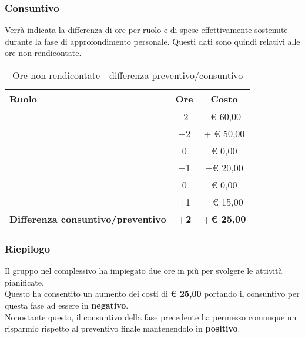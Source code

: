 		\subsubsection{Consuntivo} %
		\label{ssub:consuntivo}
		Verrà indicata la differenza di ore per ruolo e di spese effettivamente sostenute durante la fase di approfondimento personale. Questi dati sono quindi relativi alle ore non rendicontate.
		\begin{table}[!h]
			\begin{center}
				\begin{tabularx}{0.75\textwidth}{|X|c|c|}
					\hline
					\textbf{Ruolo} & \textbf{Ore} & \textbf{Costo} \\
					\hline
					\roleProjectManager & -2 & -\euro{} 60,00 \\
					\hline
					\roleAnalyst & +2 & + \euro{} 50,00 \\
					\hline
					\roleDesigner & 0 & \euro{} 0,00 \\
					\hline
					\roleAdministrator & +1  & +\euro{} 20,00 \\
					\hline
					\roleProgrammer & 0 & \euro{} 0,00 \\
					\hline
					\roleVerifier & +1 & +\euro{} 15,00 \\
					\hline
					\textbf{Differenza consuntivo/preventivo} & \textbf{+2} & \textbf{+\euro{} 25,00} \\
					\hline
				\end{tabularx}
			\end{center}
		\caption{Ore non rendicontate - differenza preventivo/consuntivo}
		\end{table}
	
		\subsubsection{Riepilogo} %
		\label{ssub:riepilogo}
		Il gruppo nel complessivo ha impiegato due ore in più per svolgere le attività pianificate. \\
		Questo ha consentito un aumento dei costi di \textbf{\euro{} 25,00} portando il consuntivo per questa fase ad essere in \textbf{negativo}. \\
		Nonostante questo, il consuntivo della fase precedente ha permesso comunque un risparmio rispetto al preventivo finale mantenendolo in \textbf{positivo}.
		

